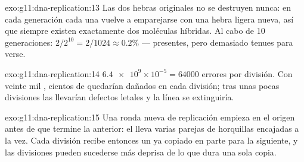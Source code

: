 \begin{solution}{exo:g11:dna-replication:13}
Las dos hebras originales no se destruyen nunca: en cada generación
cada una vuelve a emparejarse con una hebra ligera nueva, así que
siempre existen exactamente dos moléculas híbridas. Al cabo de 10
generaciones: $2/2^{10} = 2/1024
\approx 0.2\%$ --- presentes, pero
demasiado tenues para verse.
\end{solution}

\begin{solution}{exo:g11:dna-replication:14}
$\num{6.4e9} \times 10^{-5} = \num{64000}$ errores por división. Con
veinte mil , cientos de  quedarían dañados en cada división;
tras unas pocas divisiones las  llevarían defectos letales y la
línea se extinguiría.
\end{solution}

\begin{solution}{exo:g11:dna-replication:15}
Una ronda nueva de replicación empieza en el origen antes de que
termine la anterior: el  lleva varias parejas de horquillas
encajadas a la vez. Cada división recibe entonces un  ya
copiado en parte para la siguiente, y las divisiones pueden sucederse
más deprisa de lo que dura una sola copia.
\end{solution}

